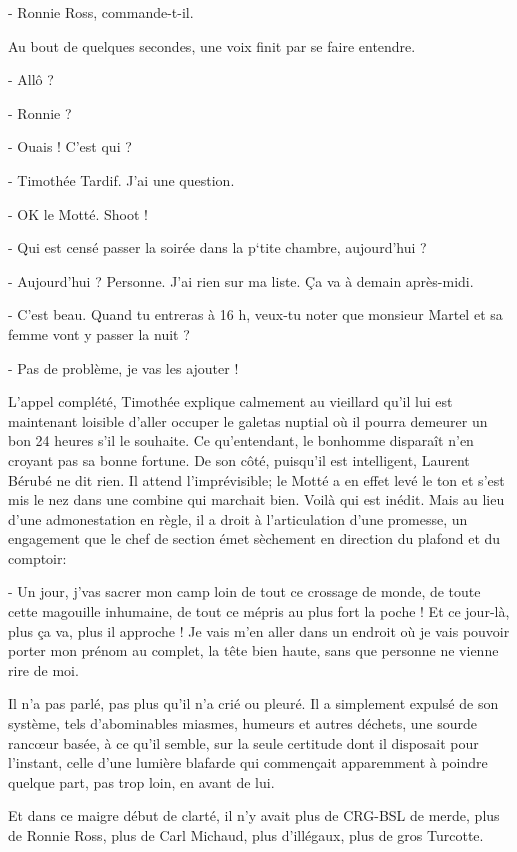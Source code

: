 - Ronnie Ross, commande-t-il.

Au bout de quelques secondes, une voix finit par se faire entendre.

- Allô ?

- Ronnie ?

- Ouais ! C’est qui ?

- Timothée Tardif. J’ai une question.

- OK le Motté. Shoot !

- Qui est censé passer la soirée dans la p‘tite chambre, aujourd’hui ?

- Aujourd’hui ? Personne. J’ai rien sur ma liste. Ça va à demain après-midi.

- C’est beau. Quand tu entreras à 16 h, veux-tu noter que monsieur Martel et sa femme vont y passer la nuit ?

- Pas de problème, je vas les ajouter !

L’appel complété, Timothée explique calmement au vieillard qu’il lui est maintenant loisible d’aller occuper le galetas nuptial où il pourra demeurer un bon 24 heures s’il le souhaite. Ce qu’entendant, le bonhomme disparaît n’en croyant pas sa bonne fortune. De son côté, puisqu’il est intelligent, Laurent Bérubé ne dit rien. Il attend l’imprévisible; le Motté a en effet levé le ton et s’est mis le nez dans une combine qui marchait bien. Voilà qui est inédit. Mais au lieu d’une admonestation en règle, il a droit à l’articulation d’une promesse, un engagement que le chef de section émet sèchement en direction du plafond et du comptoir:

- Un jour, j’vas sacrer mon camp loin de tout ce crossage de monde, de toute cette magouille inhumaine, de tout ce mépris au plus fort la poche ! Et ce jour-là, plus ça va, plus il approche ! Je vais m’en aller dans un endroit où je vais pouvoir porter mon prénom au complet, la tête bien haute, sans que personne ne vienne rire de moi.

Il n’a pas parlé, pas plus qu’il n’a crié ou pleuré. Il a simplement expulsé de son système, tels d’abominables miasmes, humeurs et autres déchets, une sourde rancœur basée, à ce qu’il semble, sur la seule certitude dont il disposait pour l’instant, celle d’une lumière blafarde qui commençait apparemment à poindre quelque part, pas trop loin, en avant de lui.

Et dans ce maigre début de clarté, il n’y avait plus de CRG-BSL de merde, plus de Ronnie Ross, plus de Carl Michaud, plus d’illégaux, plus de gros Turcotte.

